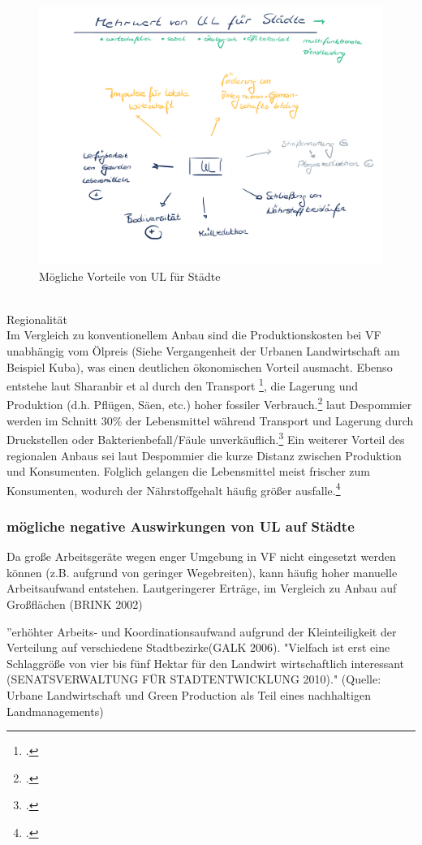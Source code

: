 \documentclass{scrartcl}
\begin{document}
\begin{figure}[htbp]
\centering
\includegraphics[width=14cm]{image_folder/moeglicheVorteileUL.png}
\caption{Mögliche Vorteile von UL für Städte}
\label{fig:MoeglicheVorteilevonUL}
\end{figure}

\\
Regionalität
\\
Im Vergleich zu konventionellem Anbau sind die Produktionskosten bei VF unabhängig vom Ölpreis (Siehe {Vergangenheit der Urbanen Landwirtschaft} am Beispiel Kuba), was einen deutlichen ökonomischen Vorteil ausmacht.
Ebenso entstehe laut Sharanbir et al durch den Transport \footcite[Vgl.][]{GrewalCanFood}, die Lagerung und Produktion (d.h. Pflügen, Säen, etc.) hoher fossiler Verbrauch.\footcite[]{2012TheEssay}  
laut Despommier werden im Schnitt 30\% der Lebensmittel während Transport und Lagerung durch Druckstellen oder Bakterienbefall/Fäule unverkäuflich.\footcite{Despommier2009TheFarms}
Ein weiterer Vorteil des regionalen Anbaus sei laut Despommier die kurze Distanz zwischen Produktion und Konsumenten. Folglich gelangen die Lebensmittel meist frischer zum Konsumenten, wodurch der Nährstoffgehalt häufig größer ausfalle.\footcite{Despommier2009TheFarms}


     
 \subsubsection{mögliche negative Auswirkungen von UL auf Städte}
 
Da große Arbeitsgeräte wegen enger Umgebung in VF nicht eingesetzt werden können (z.B. aufgrund von geringer Wegebreiten), kann häufig hoher manuelle Arbeitsaufwand entstehen.
     Lautgeringerer Erträge, im Vergleich zu Anbau auf Großflächen (BRINK 2002)
     \item ”erhöhter Arbeits‐ und Koordinationsaufwand aufgrund der Kleinteiligkeit der Verteilung auf verschiedene Stadtbezirke(GALK 2006). "Vielfach ist erst eine Schlaggröße von vier bis fünf Hektar für den Landwirt wirtschaftlich interessant (SENATSVERWALTUNG FÜR STADTENTWICKLUNG 2010)." (Quelle: Urbane Landwirtschaft und Green Production als Teil eines nachhaltigen Landmanagements)
 
\end{document}
